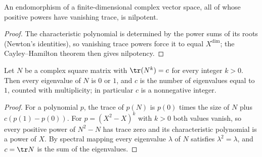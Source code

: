 \begin{lemma}
    \label{thm:asym_nilpotent_trace_powers}
    \leanok
    An endomorphism of a finite-dimensional complex vector space, all of
    whose positive powers have vanishing trace, is nilpotent.
\end{lemma}

\begin{proof}
    \leanok
    The characteristic polynomial is determined by the power sums of its
    roots (Newton's identities), so vanishing trace powers force it to
    equal $X^{\dim}$; the Cayley--Hamilton theorem then gives nilpotency.
\end{proof}

\begin{lemma}
    \label{thm:wordflags_constant_trace_powers}
    \leanok
    Let $N$ be a complex square matrix with $\tr(N^k)=c$ for every integer
    $k>0$. Then every eigenvalue of $N$ is $0$ or $1$, and $c$ is the number
    of eigenvalues equal to $1$, counted with multiplicity; in particular $c$
    is a nonnegative integer.
\end{lemma}

\begin{proof}
    \leanok
    For a polynomial $p$, the trace of $p(N)$ is $p(0)$ times the size of
    $N$ plus $c(p(1)-p(0))$. For $p=(X^2-X)^k$ with $k>0$ both values
    vanish, so every positive power of $N^2-N$ has trace zero and its
    characteristic polynomial is a power of $X$. By spectral mapping every
    eigenvalue $\lambda$ of $N$ satisfies $\lambda^2=\lambda$, and
    $c=\tr N$ is the sum of the eigenvalues.
\end{proof}


